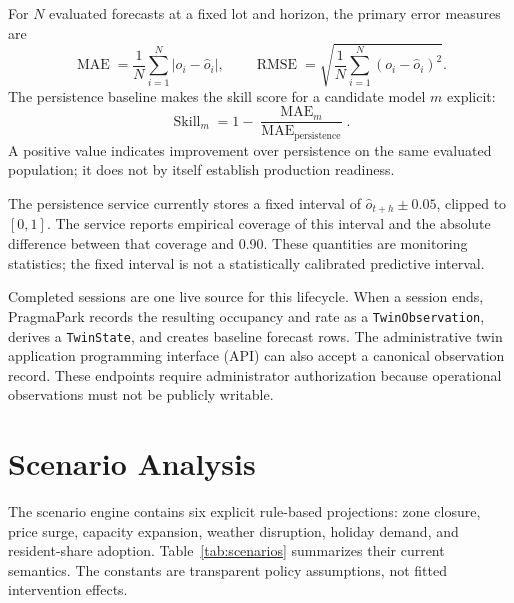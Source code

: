 \documentclass[conference]{IEEEtran}
\begin{document}
For $N$ evaluated forecasts at a fixed lot and horizon, the primary error measures are
\begin{equation}
\operatorname{MAE}=\frac{1}{N}\sum_{i=1}^{N}|o_i-\hat{o}_i|,
\qquad
\operatorname{RMSE}=\sqrt{\frac{1}{N}\sum_{i=1}^{N}(o_i-\hat{o}_i)^2}.
\label{eq:forecastmetrics}
\end{equation}
The persistence baseline makes the skill score for a candidate model $m$ explicit:
\begin{equation}
\operatorname{Skill}_m=1-
\frac{\operatorname{MAE}_m}{\operatorname{MAE}_{\mathrm{persistence}}}.
\label{eq:skill}
\end{equation}
A positive value indicates improvement over persistence on the same evaluated population; it does not by itself establish production readiness.

The persistence service currently stores a fixed interval of $\hat{o}_{t+h}\pm0.05$, clipped to $[0,1]$. The service reports empirical coverage of this interval and the absolute difference between that coverage and 0.90. These quantities are monitoring statistics; the fixed interval is not a statistically calibrated predictive interval.

Completed sessions are one live source for this lifecycle. When a session ends, PragmaPark records the resulting occupancy and rate as a \texttt{TwinObservation}, derives a \texttt{TwinState}, and creates baseline forecast rows. The administrative twin application programming interface (API) can also accept a canonical observation record. These endpoints require administrator authorization because operational observations must not be publicly writable.

\section{Scenario Analysis}

The scenario engine contains six explicit rule-based projections: zone closure, price surge, capacity expansion, weather disruption, holiday demand, and resident-share adoption. Table~\ref{tab:scenarios} summarizes their current semantics. The constants are transparent policy assumptions, not fitted intervention effects.
\end{document}
